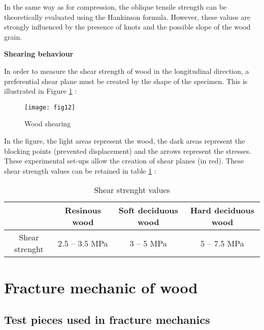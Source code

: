 In the same way as for compression, the oblique tensile strength can be theoretically evaluated using the Hankinson formula. However, these values are strongly influenced by the presence of knots and the possible slope of the wood grain.

\smallskip

\textbf{Shearing behaviour}

In order to measure the shear strength of wood in the longitudinal direction, a preferential shear plane must be created by the shape of the specimen. This is illustrated in Figure \ref{fig:fig12} :


\begin{figure}[htp]
	\centering
	\texttt{[image: fig12]}
	\caption{Wood shearing}
	\label{fig:fig12}
\end{figure}

In the figure, the light areas represent the wood, the dark areas represent the blocking points (prevented displacement) and the arrows represent the stresses. These experimental set-ups allow the creation of shear planes (in red). These shear strength values can be retained in table \ref{fig:fig13} :

\begin{table} \centering
\begin{tabular}{cccc}
	\toprule %
	& Resinous wood & Soft deciduous wood & Hard deciduous wood \\\midrule
Shear strenght & 2.5 -- 3.5 \unit{\mega\pascal}
	& 3 -- 5 \unit{\mega\pascal} & 5 -- 7.5 \unit{\mega\pascal}\\
	  \bottomrule %
\end{tabular}
	\caption{Shear strenght values}
	\label{fig:fig13}
\end{table}

%


\section{Fracture mechanic of wood}

\subsection{Test pieces used in fracture mechanics}

